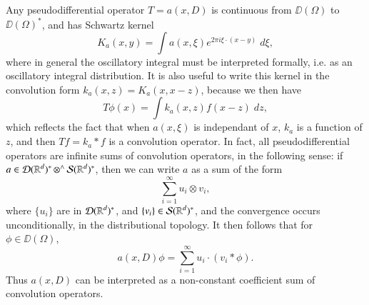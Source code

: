 Any pseudodifferential operator $T = a(x,D)$ is continuous from $\DD(\Omega)$ to $\DD(\Omega)^*$, and has Schwartz kernel
%
\[ K_a(x,y) = \int a(x,\xi) e^{2 \pi i \xi \cdot (x - y)}\; d\xi, \]
%
where in general the oscillatory integral must be interpreted formally, i.e. as an oscillatory integral distribution. It is also useful to write this kernel in the convolution form $k_a(x,z) = K_a(x,x-z)$, because we then have
%
\[ T\phi(x) = \int k_a(x,z) f(x-z)\; dz, \]
%
which reflects the fact that when $a(x,\xi)$ is independant of $x$, $k_a$ is a function of $z$, and then $Tf = k_a * f$ is a convolution operator. In fact, all pseudodifferential operators are infinite sums of convolution operators, in the following sense: if $a \in \operatorname{\mathcal{D}}(\operatorname{\mathbb{R}}^d)^* \operatorname{{{\otimes}^\wedge}} \operatorname{\mathcal{S}}(\operatorname{\mathbb{R}}^d)^*$, then we can write $a$ as a sum of the form
%
\[ \sum_{i = 1}^\infty u_i \otimes v_i, \]
%
where $\{ u_i \}$ are in $\operatorname{\mathcal{D}}(\operatorname{\mathbb{R}}^d)^*$, and $\{ v_i \} \in \operatorname{\mathcal{S}}(\operatorname{\mathbb{R}}^d)^*$, and the convergence occurs unconditionally, in the distributional topology. It then follows that for $\phi \in \DD(\Omega)$,
%
\[ a(x,D) \phi = \sum_{i = 1}^\infty u_i \cdot (v_i * \phi). \]
%
Thus $a(x,D)$ can be interpreted as a non-constant coefficient sum of convolution operators.

